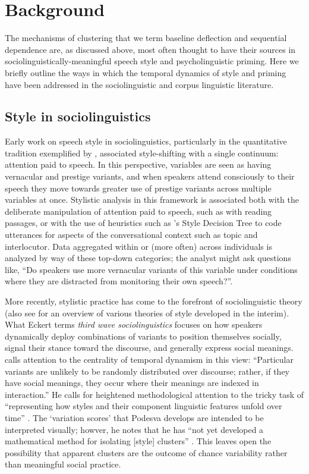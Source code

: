 \documentclass[12pt]{article}
\begin{document}
\section{Background}

The mechanisms of clustering that we term baseline deflection and sequential dependence are, as discussed above, most often thought to have their sources in sociolinguistically-meaningful speech style and psycholinguistic priming. Here we briefly outline the ways in which the temporal dynamics of style and priming have been addressed in the sociolinguistic and corpus linguistic literature.

\subsection{Style in sociolinguistics} \label{style}

Early work on speech style in sociolinguistics, particularly in the quantitative tradition exemplified by \citep{Labov:1966}, associated style-shifting with a single continuum: attention paid to speech. In this perspective, variables are seen as having vernacular and prestige variants, and when speakers attend consciously to their speech they move towards greater use of prestige variants across multiple variables at once. Stylistic analysis in this framework is  associated both with the deliberate manipulation of attention paid to speech, such as with reading passages, or with the use of heuristics such as \citet{Labov:2001}'s Style Decision Tree to code utterances for  aspects of the conversational context such as topic and interlocutor. Data aggregated within or (more often) across individuals is analyzed by way of these top-down categories; the analyst might ask questions like, ``Do speakers use more vernacular variants of this variable under conditions where they are distracted from monitoring their own speech?''. 

More recently, stylistic practice has come to the forefront of sociolinguistic theory \citep{Eckert:2012} (also see \citet{Eckert:2001} for an overview of various theories of style developed in the interim). What Eckert terms \emph{third wave sociolinguistics} focuses on how speakers dynamically deploy combinations of variants to position themselves socially, signal their stance toward the discourse, and generally express social meanings. \citet[3]{Podesva:2008} calls attention to the centrality of temporal dynamism in this view: ``Particular variants are unlikely to be randomly distributed over discourse; rather, if they have social meanings, they occur where their meanings are indexed in interaction.'' He calls for heightened methodological attention to the tricky task of ``representing how styles and their component linguistic features unfold over time'' \citeyearpar[6]{Podesva:2008}. The `variation scores' that Podesva develops are intended to be interpreted visually; howver, he notes that he has ``not yet developed a mathematical method for isolating [style] clusters'' \citeyearpar[7]{Podesva:2008}. This leaves open the possibility that apparent clusters are the outcome of chance variability rather than meaningful social practice. 
\end{document}
